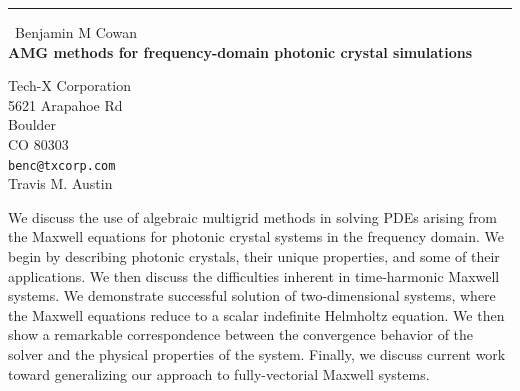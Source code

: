 \documentclass{report}
\begin{document}
\begin{center}
\rule{6in}{1pt} \
{\large Benjamin M Cowan \\
{\bf AMG methods for frequency-domain photonic crystal simulations}}

Tech-X Corporation \\ 5621 Arapahoe Rd \\ Boulder \\ CO 80303
\\
{\tt benc@txcorp.com}\\
Travis M. Austin\end{center}

We discuss the use of algebraic multigrid methods in solving PDEs arising
from the Maxwell equations for photonic crystal systems in the frequency
domain. We begin by describing photonic crystals, their unique
properties, and some of their applications. We then discuss the
difficulties inherent in time-harmonic Maxwell systems. We demonstrate
successful solution of two-dimensional systems, where the Maxwell
equations reduce to a scalar indefinite Helmholtz equation. We then show
a remarkable correspondence between the convergence behavior of the
solver and the physical properties of the system. Finally, we discuss
current work toward generalizing our approach to fully-vectorial Maxwell
systems.
\end{document}
